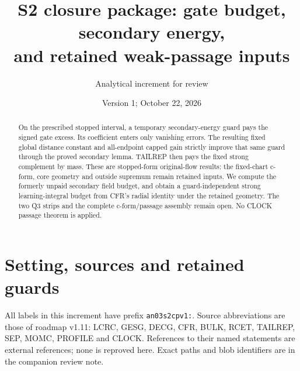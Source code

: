 \documentclass[11pt]{article}
\title{S2 closure package: gate budget, secondary energy,\\and retained weak-passage inputs}
\author{Analytical increment for review}
\date{Version 1; October 22, 2026}
\theoremstyle{remark}\newtheorem{remark}[theorem]{Remark}
\begin{document}
\maketitle
\begin{abstract}
On the prescribed stopped interval, a temporary secondary-energy
guard pays the signed gate excess. Its coefficient enters only
vanishing errors. The resulting fixed global distance constant and
all-endpoint capped gain strictly improve that same guard through
the proved secondary lemma. TAILREP then pays the fixed strong
complement by mass. These are stopped-form original-flow results:
the fixed-chart c-form, core geometry and outside supremum remain
retained inputs. We compute the formerly unpaid secondary field
budget, and obtain a guard-independent strong learning-integral
budget from CFR's radial identity under the retained geometry.
The two Q3 strips and the complete c-form/passage assembly remain
open. No CLOCK passage theorem is applied.
\end{abstract}

\section{Setting, sources and retained guards}
All labels in this increment have prefix \texttt{an03s2cpv1:}.
Source abbreviations are those of roadmap v1.11: LCRC, GESG,
DECG, CFR, BULK, RCET, TAILREP, SEP, MOMC, PROFILE and CLOCK.
References to their named statements are external references;
none is reproved here. Exact paths and blob identifiers are in
the companion review note.
\end{document}
